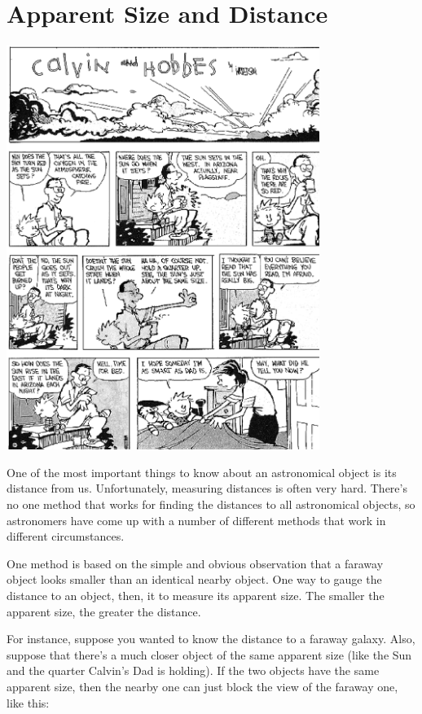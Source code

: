 \section{Apparent Size and Distance}

\answerspace{0.5in}
\centerline{\includegraphics[width=4in]{localdistance/calvin-sun.eps}}
\answerspace{0.5in}

One of the most important things to know about an astronomical
object is its distance from us.  Unfortunately, measuring distances
is often very hard.  There's no one method that works for
finding the distances to all astronomical objects, so 
astronomers have come up with a number of different
methods that work in different circumstances.

One method is based on the simple and obvious observation that a 
faraway object looks smaller than an identical nearby object.
One way to gauge the distance to an object, then, it to measure
its apparent size.  The smaller the apparent size, the greater
the distance.

For instance, suppose you wanted to know the distance to a faraway
galaxy.  Also, suppose that there's a much closer object of the
same apparent size (like the Sun and the quarter Calvin's Dad is holding).
If the two objects have the same apparent size, then the nearby one
can just block the view of the faraway one, like this:

